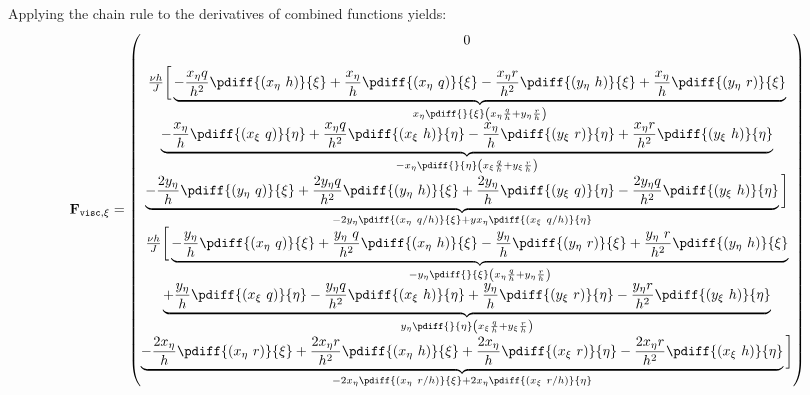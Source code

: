 %
Applying the chain rule to the derivatives of combined functions yields:
%
	\begin{align} \label{eq:Fvisc_transformed_xietasplit_chainrule}
		\mathbf{F}_{\texttt{visc},\xi}=
		\begin{pmatrix}
			0 \\
			\\
			\frac{\nu h}{J} \bigg[
			\underbrace{-\frac{x_{\eta} q}{h^2}\pdiff{(x_{\eta}\ h)}{\xi}
				+ \frac{x_{\eta}}{h} \pdiff{(x_{\eta}\ q)}{\xi}
				- \frac{x_{\eta}r}{h^2} \pdiff{(y_{\eta}\ h)}{\xi}
				+ \frac{x_{\eta}}{h} \pdiff{(y_{\eta}\ r)}{\xi}}_{x_{\eta} \pdiff{}{\xi}\left( x_{\eta}\frac{q}{h} + y_{\eta}\frac{r}{h}  \right)}\\
			\underbrace{- \frac{x_{\eta} }{h} \pdiff{(x_{\xi}\ q)}{\eta}
				+ \frac{x_{\eta} q}{h^2} \pdiff{ (x_{\xi}\ h)}{\eta}
				- \frac{x_{\eta} }{h} \pdiff{(y_{\xi}\ r)}{\eta}
				+ \frac{x_{\eta} r}{h^2} \pdiff{ (y_{\xi}\ h)}{\eta}}_{ - x_{\eta} \pdiff{}{\eta}\left( x_{\xi} \frac{q}{h} + y_{\xi} \frac{r}{h}  \right)}\\
			\underbrace{- \frac{2 y_{\eta}}{h}  \pdiff{ (y_{\eta}\ q)}{\xi}
				+ \frac{2 y_{\eta} q }{h^2}  \pdiff{ (y_{\eta}\ h)}{\xi}
				+ \frac{2 y_{\eta}}{h}  \pdiff{(y_{\xi}\ q)}{\eta}
				- \frac{2 y_{\eta} q}{h^2} \pdiff{(y_{\xi}\ h)}{\eta}}_{        - 2 y_{\eta} \pdiff{(x_{\eta}\ q/h)}{\xi}
				+ y x_{\eta}  \pdiff{(x_{\xi}\ q/h)}{\eta}}\bigg]\\
			\frac{\nu h}{J} \bigg[
			\underbrace{- \frac{y_{\eta}}{h} \pdiff{(x_{\eta}\ q)}{\xi}
				+ \frac{y_{\eta}\ q }{h^2} \pdiff{(x_{\eta}\ h)}{\xi}
				- \frac{y_{\eta}}{h} \pdiff{(y_{\eta}\ r)}{\xi}
				+ \frac{y_{\eta}\ r }{h^2} \pdiff{(y_{\eta}\ h)}{\xi}}_{-y_{\eta} \pdiff{}{\xi} \left(
				x_{\eta} \frac{q}{h}+ y_{\eta} \frac{r}{h} \right)}\\
			\underbrace{+\frac{y_{\eta}}{h}   \pdiff{(x_{\xi}\ q)}{\eta}
				-\frac{y_{\eta}q}{h^2}   \pdiff{(x_{\xi}\ h)}{\eta}
				+ \frac{y_{\eta}}{h} \pdiff{(y_{\xi}\ r)}{\eta}
				- \frac{y_{\eta}r}{h^2} \pdiff{(y_{\xi}\ h)}{\eta}}_{ y_{\eta} \pdiff{}{\eta} \left(
				x_{\xi} \frac{q}{h} + y_{\xi} \frac{r}{h}  \right)}\\
			\underbrace{- \frac{2 x_{\eta}}{h} \pdiff{(x_{\eta}\ r)}{\xi}
				+ \frac{2 x_{\eta}r}{h^2} \pdiff{(x_{\eta}\  h)}{\xi}
				+ \frac{2 x_{\eta}}{h}  \pdiff{(x_{\xi}\ r)}{\eta}
				- \frac{2 x_{\eta}r}{h^2}  \pdiff{(x_{\xi}\ h)}{\eta}}_{        - 2 x_{\eta} \pdiff{(x_{\eta}\ r/h)}{\xi}
				+ 2 x_{\eta}  \pdiff{(x_{\xi}\ r/h)}{\eta}}\bigg]
		\end{pmatrix}
	\end{align}
